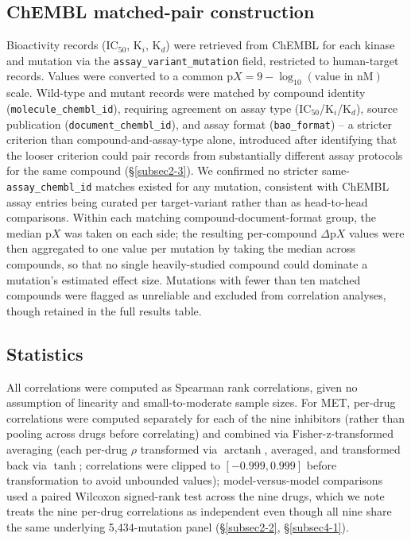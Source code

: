 \documentclass[pdflatex,sn-mathphys-num]{sn-jnl}%
\theoremstyle{thmstyleone}%
\theoremstyle{thmstyletwo}%
\theoremstyle{thmstylethree}%
\begin{document}
\subsection{ChEMBL matched-pair construction}\label{subsec3-4}

Bioactivity records (IC$_{50}$, K$_i$, K$_d$) were retrieved from ChEMBL \citep{Gaulton2012,Zdrazil2024} for each kinase and mutation via the \texttt{assay\_variant\_mutation} field, restricted to human-target records. Values were converted to a common $\mathrm{p}X = 9 - \log_{10}(\text{value in nM})$ scale. Wild-type and mutant records were matched by compound identity (\texttt{molecule\_chembl\_id}), requiring agreement on assay type (IC$_{50}$/K$_i$/K$_d$), source publication (\texttt{document\_chembl\_id}), and assay format (\texttt{bao\_format}) -- a stricter criterion than compound-and-assay-type alone, introduced after identifying that the looser criterion could pair records from substantially different assay protocols for the same compound (\S\ref{subsec2-3}). We confirmed no stricter same-\texttt{assay\_chembl\_id} matches existed for any mutation, consistent with ChEMBL assay entries being curated per target-variant rather than as head-to-head comparisons. Within each matching compound-document-format group, the median $\mathrm{p}X$ was taken on each side; the resulting per-compound $\Delta \mathrm{p}X$ values were then aggregated to one value per mutation by taking the median across compounds, so that no single heavily-studied compound could dominate a mutation's estimated effect size. Mutations with fewer than ten matched compounds were flagged as unreliable and excluded from correlation analyses, though retained in the full results table.

\subsection{Statistics}\label{subsec3-5}

All correlations were computed as Spearman rank correlations, given no assumption of linearity and small-to-moderate sample sizes. For MET, per-drug correlations were computed separately for each of the nine inhibitors (rather than pooling across drugs before correlating) and combined via Fisher-z-transformed averaging (each per-drug $\rho$ transformed via $\operatorname{arctanh}$, averaged, and transformed back via $\tanh$; correlations were clipped to $[-0.999, 0.999]$ before transformation to avoid unbounded values); model-versus-model comparisons used a paired Wilcoxon signed-rank test \citep{Wilcoxon1945} across the nine drugs, which we note treats the nine per-drug correlations as independent even though all nine share the same underlying 5{,}434-mutation panel (\S\ref{subsec2-2}, \S\ref{subsec4-1}).
\end{document}
